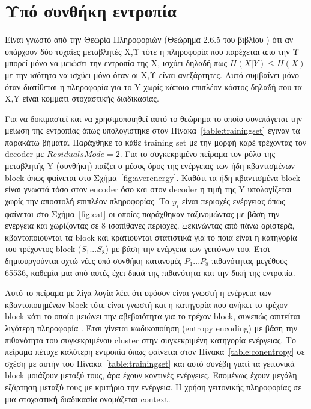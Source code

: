 \section{Υπό συνθήκη εντροπία}
\label{section:sect45}

\indent Είναι γνωστό από την Θεωρία Πληροφοριών (Θεώρημα 2.6.5 του βιβλίου \cite{cover}) ότι αν υπάρχουν δύο τυχαίες μεταβλητές Χ,Υ τότε η πληροφορία που παρέχεται απο την Υ μπορεί μόνο να μειώσει την εντροπία της Χ, ισχύει δηλαδή πως $ H(X|Y) \leq H(X)$ με την ισότητα να ισχύει μόνο όταν οι Χ,Υ είναι ανεξάρτητες. Αυτό συμβαίνει μόνο όταν διατίθεται η πληροφορία για το Y χωρίς κάποιο επιπλέον κόστος δηλαδή που τα X,Y είναι κομμάτι στοχαστικής διαδικασίας.

\indent Για να δοκιμαστεί και να χρησιμοποιηθεί αυτό το θεώρημα το οποίο συνεπάγεται την μείωση της εντροπίας όπως υπολογίστηκε στον Πίνακα~\ref{table:trainingset} έγιναν τα παρακάτω βήματα. Παράχθηκε το κάθε training set με την μορφή καρέ τρέχοντας τον decoder με $ResidualsMode=2$. Για το συγκεκριμένο πείραμα τον ρόλο της μεταβλητής Y (συνθήκη) παίζει ο μέσος όρος της ενέργειας των ήδη κβαντισμένων block όπως φαίνεται στο Σχήμα~\ref{fig:averenergy}. Καθότι τα ήδη κβαντισμένα block είναι γνωστά τόσο στον encoder όσο και στον decoder η τιμή της Y υπολογίζεται χωρίς την αποστολή επιπλέον πληροφορίας. Τα $y_i$ είναι περιοχές ενέργειας όπως φαίνεται στο Σχήμα~\ref{fig:cat} οι οποίες παράχθηκαν ταξινομώντας με βάση την ενέργεια και χωρίζοντας σε 8 ισοπίθανες περιοχές. Ξεκινώντας από πάνω αριστερά, κβαντοποιούνται τα block και κρατιούνται στατιστικά για το ποια είναι η κατηγορία του τρέχοντος block ($S_1 ... S_8$) με βάση την ενέργεια των γειτόνων του. Έτσι δημιουργούνται οχτώ νέες υπό συνθήκη κατανομές $P_1 ... P_8$ πιθανότητας μεγέθους 65536, καθεμία μια από αυτές έχει δικιά της πιθανότητα και την δική της εντροπία.

\indent Αυτό το πείραμα με λίγα λογία λέει ότι εφόσον είναι γνωστή η ενέργεια των κβαντοποιημένων block τότε είναι γνωστή και η κατηγορία που ανήκει το τρέχον block κάτι το οποίο μειώνει την αβεβαιότητα  για το τρέχον block, συνεπώς απιτείται λιγότερη πληροφορία . Έτσι γίνεται κωδικοποίηση (entropy encoding) με βάση την πιθανότητα του συγκεκριμένου cluster στην συγκεκριμένη κατηγορία ενέργειας. Το πείραμα πέτυχε καλύτερη εντροπία όπως φαίνεται στον Πίνακα~\ref{table:conentropy} σε σχέση με αυτήν του Πίνακα~\ref{table:trainingset} και αυτό συνέβη γιατί τα γειτονικά block μοιάζουν μεταξύ τους, άρα έχουν κοντινές ενέργειες. Επομένως έχουν μεγάλη εξάρτηση μεταξύ τους με κριτήριο την ενέργεια. Η χρήση γειτονικής πληροφορίας σε μια στοχαστική διαδικασία ονομάζεται context.

